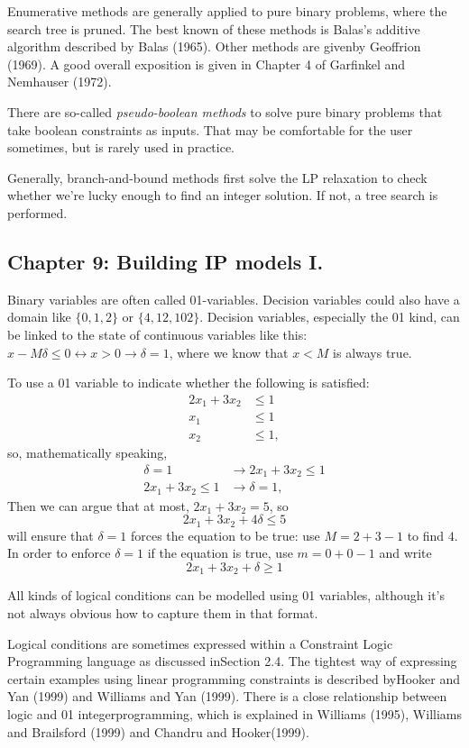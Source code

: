 \documentclass[13pt, letterpaper, twoside]{book}
\begin{document}
Enumerative methods are generally applied to pure binary problems, where the search tree is pruned. The best known of these methods is Balas's additive algorithm described by Balas (1965). Other methods are givenby Geoffrion (1969). A good overall exposition is given in Chapter 4 of Garfinkel and Nemhauser (1972).

There are so-called \textit{pseudo-boolean methods} to solve pure binary problems that take boolean constraints as inputs. That may be comfortable for the user sometimes, but is rarely used in practice.

Generally, branch-and-bound methods first solve the LP relaxation to check whether we're lucky enough to find an integer solution. If not, a tree search is performed. 

\subsection{Chapter 9: Building IP models I.}

Binary variables are often called 01-variables. Decision variables could also have a domain like $\{0,1,2\}$ or $\{4,12,102\}$. Decision variables, especially the 01 kind, can be linked to the state of continuous variables like this: $x-M\delta \leq 0 \leftrightarrow x>0 \rightarrow \delta = 1$, where we know that $x < M$ is always true.

To use a 01 variable to indicate whether the following is satisfied:
\begin{align}
2x_1 + 3x_2 &\leq 1\\
x_1 &\leq 1\\
x_2 &\leq 1,
\end{align}
so, mathematically speaking,
\begin{align}
\delta = 1 &\rightarrow 2x_1 + 3x_2 \leq 1\\
2x_1 + 3x_2 \leq 1 &\rightarrow \delta = 1,
\end{align}
Then we can argue that at most, $2x_1 + 3x_2 = 5$, so
\[
2x_1 + 3x_2 + 4\delta \leq 5
\]
will ensure that $\delta = 1$ forces the equation to be true: use $M = 2 + 3 - 1$ to find $4$. In order to enforce $\delta = 1$ if the equation is true, use $m = 0 + 0 -1$ and write
\[
2x_1 + 3x_2 + \delta \geq 1
\]

All kinds of logical conditions can be modelled using 01 variables, although it's not always obvious how to capture them in that format. 

Logical conditions are sometimes expressed within a Constraint Logic Programming language as discussed inSection 2.4. The tightest way of expressing certain examples using linear programming constraints is described byHooker and Yan (1999) and Williams and Yan (1999). There is a close relationship between logic and 01 integerprogramming, which is explained in Williams (1995), Williams and Brailsford (1999) and Chandru and Hooker(1999).
\end{document}
